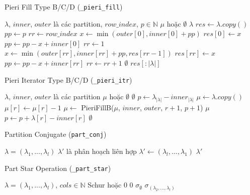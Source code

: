 \begin{algorithm}[H]
\caption{Pieri Fill Type B/C/D (\texttt{\_pieri\_fill})}
\begin{algorithmic}[1]
\REQUIRE $\lambda$, $inner$, $outer$ là các partition, $row\_index$, $p \in \mathbb{N}$
\ENSURE $\mu$ hoặc $\emptyset$
\IF{$\lambda = \emptyset$}
    \RETURN $\lambda$
\ENDIF
\STATE $res \gets \lambda.copy()$
\STATE $pp \gets p$
\STATE $rr \gets row\_index$
    \STATE $x \gets \min(outer[0], inner[0] + pp)$
    \STATE $res[0] \gets x$
    \STATE $pp \gets pp - x + inner[0]$
    \STATE $rr \gets 1$
\ENDIF
{}
    \STATE $x \gets \min(outer[rr], inner[rr] + pp, res[rr-1])$
    \STATE $res[rr] \gets x$
    \STATE $pp \gets pp - x + inner[rr]$
    \STATE $rr \gets rr + 1$
\ENDWHILE
{}
    \RETURN $\emptyset$
\ENDIF
\RETURN $res[:|\lambda|]$
\end{algorithmic}
\end{algorithm}

\begin{algorithm}[H]
\caption{Pieri Iterator Type B/C/D (\texttt{\_pieri\_itr})}
\begin{algorithmic}[1]
\REQUIRE $\lambda$, $inner$, $outer$ là các partition
\ENSURE $\mu$ hoặc $\emptyset$
\IF{$\lambda = \emptyset$}
    \RETURN $\emptyset$
\ENDIF
\STATE $p \gets \lambda_{|\lambda|} - inner_{|\lambda|}$
        \STATE $\mu \gets \lambda.copy()$
        \STATE $\mu[r] \gets \mu[r] - 1$
        \STATE $\mu \gets$ PieriFillB($\mu$, $inner$, $outer$, $r+1$, $p+1$)
        \IF{$\mu \neq \emptyset$}
            \RETURN $\mu$
        \ENDIF
    \ENDIF
    \STATE $p \gets p + \lambda[r] - inner[r]$
\ENDFOR
\RETURN $\emptyset$
\end{algorithmic}
\end{algorithm}

\begin{algorithm}[H]
\caption{Partition Conjugate (\texttt{part\_conj})}
\begin{algorithmic}[1]
\REQUIRE $\lambda = (\lambda_1, ..., \lambda_l)$
\ENSURE $\lambda'$ là phân hoạch liên hợp
\STATE $\lambda' \gets (\lambda_l, ..., \lambda_1)$
\RETURN $\lambda'$
\end{algorithmic}
\end{algorithm}

\begin{algorithm}[H]
\caption{Part Star Operation (\texttt{\_part\_star})}
\begin{algorithmic}[1]
\REQUIRE $\lambda = (\lambda_1, ..., \lambda_l)$, $cols \in \mathbb{N}$
\ENSURE Schur hoặc $0$
    \RETURN $0$
\ENDIF
{}
    \RETURN $\sigma_{\emptyset}$
\ENDIF
\RETURN $\sigma_{(\lambda_2, ..., \lambda_l)}$
\end{algorithmic}
\end{algorithm}

